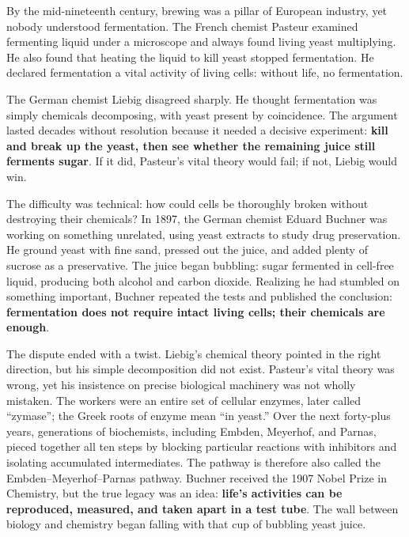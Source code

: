 \begin{zhengju}
By the mid-nineteenth century, brewing was a pillar of European industry, yet nobody understood fermentation. The French chemist Pasteur examined fermenting liquid under a microscope and always found living yeast multiplying. He also found that heating the liquid to kill yeast stopped fermentation. He declared fermentation a vital activity of living cells: without life, no fermentation.

The German chemist Liebig disagreed sharply. He thought fermentation was simply chemicals decomposing, with yeast present by coincidence. The argument lasted decades without resolution because it needed a decisive experiment: \textbf{kill and break up the yeast, then see whether the remaining juice still ferments sugar}. If it did, Pasteur's vital theory would fail; if not, Liebig would win.

The difficulty was technical: how could cells be thoroughly broken without destroying their chemicals? In 1897, the German chemist Eduard Buchner was working on something unrelated, using yeast extracts to study drug preservation. He ground yeast with fine sand, pressed out the juice, and added plenty of sucrose as a preservative. The juice began bubbling: sugar fermented in cell-free liquid, producing both alcohol and carbon dioxide. Realizing he had stumbled on something important, Buchner repeated the tests and published the conclusion: \textbf{fermentation does not require intact living cells; their chemicals are enough}.

The dispute ended with a twist. Liebig's chemical theory pointed in the right direction, but his simple decomposition did not exist. Pasteur's vital theory was wrong, yet his insistence on precise biological machinery was not wholly mistaken. The workers were an entire set of cellular enzymes, later called ``zymase''; the Greek roots of enzyme mean ``in yeast.'' Over the next forty-plus years, generations of biochemists, including Embden, Meyerhof, and Parnas, pieced together all ten steps by blocking particular reactions with inhibitors and isolating accumulated intermediates. The pathway is therefore also called the Embden--Meyerhof--Parnas pathway. Buchner received the 1907 Nobel Prize in Chemistry, but the true legacy was an idea: \textbf{life's activities can be reproduced, measured, and taken apart in a test tube}. The wall between biology and chemistry began falling with that cup of bubbling yeast juice.
\end{zhengju}

